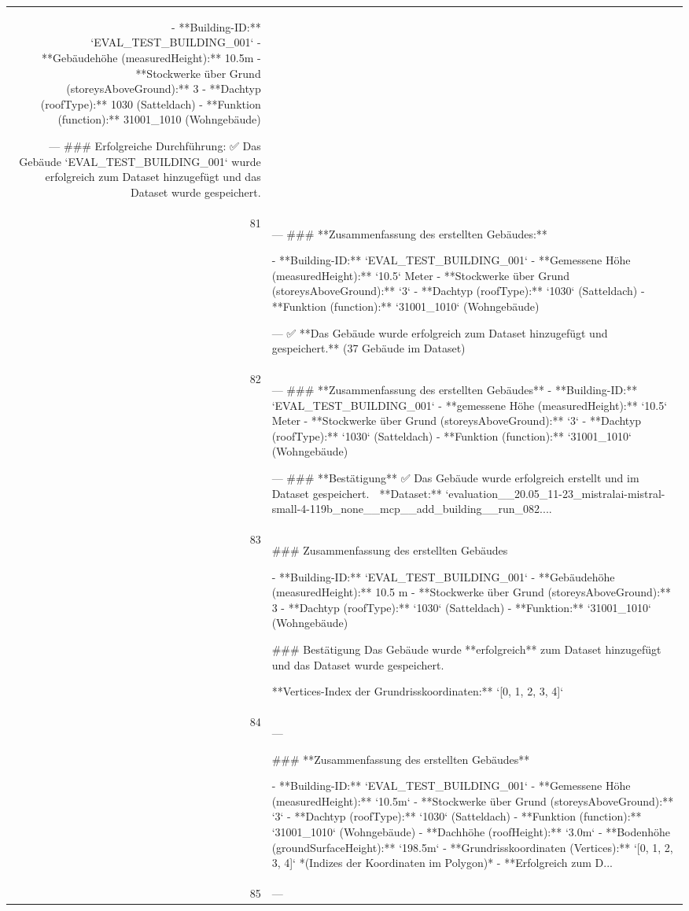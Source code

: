 \documentclass[a4paper,11pt]{article}
\begin{document}
\begin{table}[ht]
\begin{tabular}{r p{12cm}}
- **Building-ID:** `EVAL\_TEST\_BUILDING\_001`
- **Gebäudehöhe (measuredHeight):** 10.5m
- **Stockwerke über Grund (storeysAboveGround):** 3
- **Dachtyp (roofType):** 1030 (Satteldach)
- **Funktion (function):** 31001\_1010 (Wohngebäude)

---
\#\#\# Erfolgreiche Durchführung:
✅ Das Gebäude `EVAL\_TEST\_BUILDING\_001` wurde erfolgreich zum Dataset hinzugefügt und das Dataset wurde gespeichert. \\
81 & ---
\#\#\# **Zusammenfassung des erstellten Gebäudes:**

- **Building-ID:** `EVAL\_TEST\_BUILDING\_001`
- **Gemessene Höhe (measuredHeight):** `10.5` Meter
- **Stockwerke über Grund (storeysAboveGround):** `3`
- **Dachtyp (roofType):** `1030` (Satteldach)
- **Funktion (function):** `31001\_1010` (Wohngebäude)

---
✅ **Das Gebäude wurde erfolgreich zum Dataset hinzugefügt und gespeichert.** (37 Gebäude im Dataset) \\
82 & ---
\#\#\# **Zusammenfassung des erstellten Gebäudes**
- **Building-ID:** `EVAL\_TEST\_BUILDING\_001`
- **gemessene Höhe (measuredHeight):** `10.5` Meter
- **Stockwerke über Grund (storeysAboveGround):** `3`
- **Dachtyp (roofType):** `1030` (Satteldach)
- **Funktion (function):** `31001\_1010` (Wohngebäude)

---
\#\#\# **Bestätigung**
✅ Das Gebäude wurde erfolgreich erstellt und im Dataset gespeichert.
📁 **Dataset:** `evaluation\_\_20.05\_11-23\_mistralai-mistral-small-4-119b\_none\_\_mcp\_\_add\_building\_\_run\_082.... \\
83 & \#\#\# Zusammenfassung des erstellten Gebäudes

- **Building-ID:** `EVAL\_TEST\_BUILDING\_001`
- **Gebäudehöhe (measuredHeight):** 10.5 m
- **Stockwerke über Grund (storeysAboveGround):** 3
- **Dachtyp (roofType):** `1030` (Satteldach)
- **Funktion:** `31001\_1010` (Wohngebäude)

\#\#\# Bestätigung
Das Gebäude wurde **erfolgreich** zum Dataset hinzugefügt und das Dataset wurde gespeichert.

**Vertices-Index der Grundrisskoordinaten:**
`[0, 1, 2, 3, 4]` \\
84 & ---

\#\#\# **Zusammenfassung des erstellten Gebäudes**

- **Building-ID:** `EVAL\_TEST\_BUILDING\_001`
- **Gemessene Höhe (measuredHeight):** `10.5m`
- **Stockwerke über Grund (storeysAboveGround):** `3`
- **Dachtyp (roofType):** `1030` (Satteldach)
- **Funktion (function):** `31001\_1010` (Wohngebäude)
- **Dachhöhe (roofHeight):** `3.0m`
- **Bodenhöhe (groundSurfaceHeight):** `198.5m`
- **Grundrisskoordinaten (Vertices):** `[0, 1, 2, 3, 4]` *(Indizes der Koordinaten im Polygon)*
- **Erfolgreich zum D... \\
85 & ---


\end{tabular}
\end{table}
\end{document}
